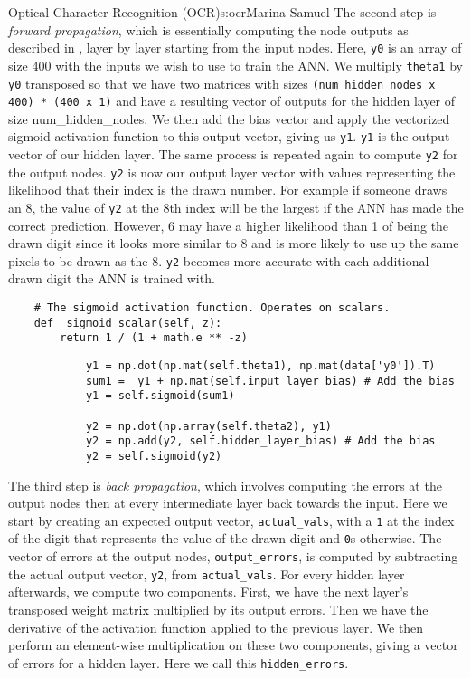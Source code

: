 \begin{aosachapter}{Optical Character Recognition (OCR)}{s:ocr}{Marina Samuel}
The second step is \emph{forward propagation}, which is essentially
computing the node outputs as described in ,
layer by layer starting from the input nodes. Here, \texttt{y0} is an
array of size 400 with the inputs we wish to use to train the ANN. We
multiply \texttt{theta1} by \texttt{y0} transposed so that we have two
matrices with sizes \texttt{(num\_hidden\_nodes x 400) * (400 x 1)} and
have a resulting vector of outputs for the hidden layer of size
num\_hidden\_nodes. We then add the bias vector and apply the vectorized
sigmoid activation function to this output vector, giving us
\texttt{y1}. \texttt{y1} is the output vector of our hidden layer. The
same process is repeated again to compute \texttt{y2} for the output
nodes. \texttt{y2} is now our output layer vector with values
representing the likelihood that their index is the drawn number. For
example if someone draws an 8, the value of \texttt{y2} at the 8th index
will be the largest if the ANN has made the correct prediction. However,
6 may have a higher likelihood than 1 of being the drawn digit since it
looks more similar to 8 and is more likely to use up the same pixels to
be drawn as the 8. \texttt{y2} becomes more accurate with each
additional drawn digit the ANN is trained with.

\begin{verbatim}
    # The sigmoid activation function. Operates on scalars.
    def _sigmoid_scalar(self, z):
        return 1 / (1 + math.e ** -z)
\end{verbatim}

\begin{verbatim}
            y1 = np.dot(np.mat(self.theta1), np.mat(data['y0']).T)
            sum1 =  y1 + np.mat(self.input_layer_bias) # Add the bias
            y1 = self.sigmoid(sum1)

            y2 = np.dot(np.array(self.theta2), y1)
            y2 = np.add(y2, self.hidden_layer_bias) # Add the bias
            y2 = self.sigmoid(y2)
\end{verbatim}

The third step is \emph{back propagation}, which involves computing the
errors at the output nodes then at every intermediate layer back towards
the input. Here we start by creating an expected output vector,
\texttt{actual\_vals}, with a \texttt{1} at the index of the digit that
represents the value of the drawn digit and \texttt{0}s otherwise. The
vector of errors at the output nodes, \texttt{output\_errors}, is
computed by subtracting the actual output vector, \texttt{y2}, from
\texttt{actual\_vals}. For every hidden layer afterwards, we compute two
components. First, we have the next layer's transposed weight matrix
multiplied by its output errors. Then we have the derivative of the
activation function applied to the previous layer. We then perform an
element-wise multiplication on these two components, giving a vector of
errors for a hidden layer. Here we call this \texttt{hidden\_errors}.


\end{aosachapter}
